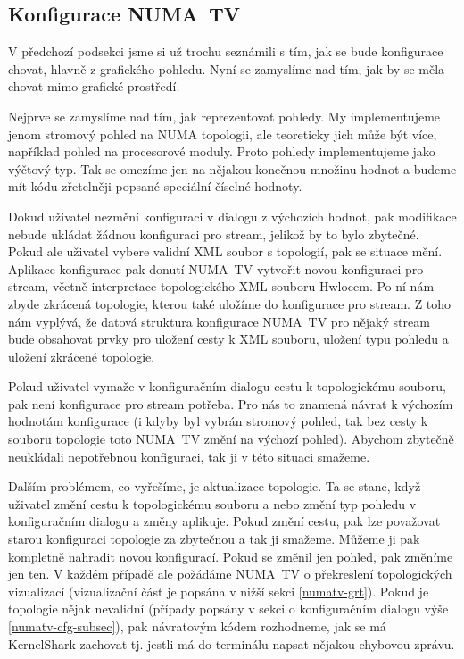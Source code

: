 \subsection{Konfigurace NUMA~TV}

V předchozí podsekci jsme si už trochu seznámili s tím, jak se bude konfigurace chovat, hlavně z grafického pohledu. Nyní se zamyslíme nad tím, jak by se měla chovat mimo grafické prostředí.

Nejprve se zamyslíme nad tím, jak reprezentovat pohledy. My implementujeme jenom stromový pohled na NUMA topologii, ale teoreticky jich může být více, například pohled na procesorové moduly. Proto pohledy implementujeme jako výčtový typ. Tak se omezíme jen na nějakou konečnou množinu hodnot a budeme mít kódu zřetelněji popsané speciální číselné hodnoty.

Dokud uživatel nezmění konfiguraci v dialogu z výchozích hodnot, pak modifikace nebude ukládat žádnou konfiguraci pro stream, jelikož by to bylo zbytečné. Pokud ale uživatel vybere validní XML soubor s topologií, pak se situace mění. Aplikace konfigurace pak donutí NUMA~TV vytvořit novou konfiguraci pro stream, včetně interpretace topologického XML souboru Hwlocem. Po ní nám zbyde zkrácená topologie, kterou také uložíme do konfigurace pro stream. Z toho nám vyplývá, že datová struktura konfigurace NUMA~TV pro nějaký stream bude obsahovat prvky pro uložení cesty k XML souboru, uložení typu pohledu a uložení zkrácené topologie.

Pokud uživatel vymaže v konfiguračním dialogu cestu k topologickému souboru, pak není konfigurace pro stream potřeba. Pro nás to znamená návrat k výchozím hodnotám konfigurace (i kdyby byl vybrán stromový pohled, tak bez cesty k souboru topologie toto NUMA~TV změní na výchozí pohled). Abychom zbytečně neukládali nepotřebnou konfiguraci, tak ji v této situaci smažeme.

Dalším problémem, co vyřešíme, je aktualizace topologie. Ta se stane, když uživatel změní cestu k topologickému souboru a nebo změní typ pohledu v konfiguračním dialogu a změny aplikuje. Pokud změní cestu, pak lze považovat starou konfiguraci topologie za zbytečnou a tak ji smažeme. Můžeme ji pak kompletně nahradit novou konfigurací. Pokud se změnil jen pohled, pak změníme jen ten. V každém případě ale požádáme  NUMA~TV o překreslení topologických vizualizací (vizualizační část je popsána v nižší sekci \ref{numatv-grt}). Pokud je topologie nějak nevalidní (případy popsány v sekci o konfiguračním dialogu výše \ref{numatv-cfg-subsec}), pak návratovým kódem rozhodneme, jak se má KernelShark zachovat tj. jestli má do terminálu napsat nějakou chybovou zprávu.

